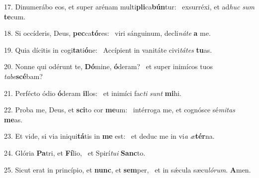 17. Dinumerábo eos, et super arénam multi\textbf{pli}ca\textbf{bún}tur: \ast\  exsurréxi, et ad\textit{huc} \textit{sum} \textbf{te}cum.\

18. Si occíderis, Deus, \textbf{pec}ca\textbf{tó}res: \ast\  viri sánguinum, decli\textit{ná}\textit{te} \textbf{a} me.\

19. Quia dícitis in cogi\textbf{ta}ti\textbf{ó}ne: \ast\  Accípient in vanitáte civi\textit{tá}\textit{tes} \textbf{tu}as.\

20. Nonne qui odérunt te, \textbf{Dó}mine, \textbf{ó}deram? \ast\  et super inimícos tuos \textit{ta}\textit{be}\textbf{scé}bam?\

21. Perfécto ódio \textbf{ó}deram \textbf{il}los: \ast\  et inimíci fac\textit{ti} \textit{sunt} \textbf{mi}hi.\

22. Proba me, Deus, et \textbf{sci}to cor \textbf{me}um: \ast\  intérroga me, et cognósce sé\textit{mi}\textit{tas} \textbf{me}as.\

23. Et vide, si via iniqui\textbf{tá}tis in \textbf{me} est: \ast\  et deduc me in vi\textit{a} \textit{æ}\textbf{tér}na.\

24. Glória \textbf{Pa}tri, et \textbf{Fí}lio, \ast\  et Spirí\textit{tu}\textit{i} \textbf{Sanc}to.\

25. Sicut erat in princípio, et \textbf{nunc}, et \textbf{sem}per, \ast\  et in sǽcula sæcu\textit{ló}\textit{rum}. \textbf{A}men.\

